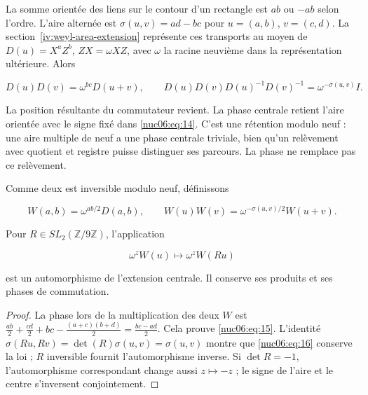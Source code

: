 La somme orientée des liens sur le contour d’un rectangle est \(ab\) ou \(-ab\) selon l’ordre. L’aire alternée est \(\sigma(u,v)=ad-bc\) pour \(u=(a,b)\), \(v=(c,d)\). La section~\ref{iv:weyl-area-extension} représente ces transports au moyen de \(D(u)=X^aZ^b\), \(ZX=\omega XZ\), avec \(\omega\) la racine neuvième dans la représentation ultérieure. Alors

\begin{equation}
D(u)D(v)=\omega^{bc}D(u+v),\qquad
D(u)D(v)D(u)^{-1}D(v)^{-1}=\omega^{-\sigma(u,v)}I.
\label{nuc06:eq:14}
\end{equation}

La position résultante du commutateur revient. La phase centrale retient l’aire orientée avec le signe fixé dans \eqref{nuc06:eq:14}. C’est une rétention modulo neuf : une aire multiple de neuf a une phase centrale triviale, bien qu’un relèvement avec quotient et registre puisse distinguer ses parcours. La phase ne remplace pas ce relèvement.


\begin{proposition}

Comme deux est inversible modulo neuf, définissons

\begin{equation}
W(a,b)=\omega^{ab/2}D(a,b),\qquad
W(u)W(v)=\omega^{-\sigma(u,v)/2}W(u+v).
\label{nuc06:eq:15}
\end{equation}

Pour \(R\in SL_2(\mathbb Z/9\mathbb Z)\), l’application

\begin{equation}
\omega^zW(u)\longmapsto\omega^zW(Ru)
\label{nuc06:eq:16}
\end{equation}

est un automorphisme de l’extension centrale. Il conserve ses produits et ses phases de commutation.
\end{proposition}

\begin{proof}
La phase lors de la multiplication des deux \(W\) est
\(\frac{ab}{2}+\frac{cd}{2}+bc-\frac{(a+c)(b+d)}2=\frac{bc-ad}{2}\). Cela prouve \eqref{nuc06:eq:15}. L’identité \(\sigma(Ru,Rv)=\det(R)\sigma(u,v)=\sigma(u,v)\) montre que \eqref{nuc06:eq:16} conserve la loi ; \(R\) inversible fournit l’automorphisme inverse. Si \(\det R=-1\), l’automorphisme correspondant change aussi \(z\mapsto-z\) ; le signe de l’aire et le centre s’inversent conjointement.
\end{proof}

